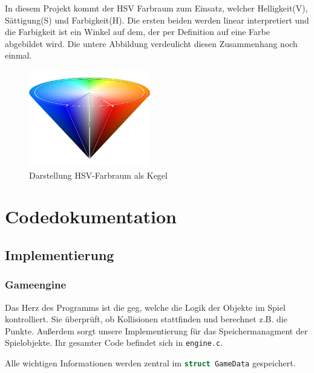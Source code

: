 \documentclass[11pt]{article}
\newcommand{\lstin}[1]{\lstinline[language=C]{#1}}
\begin{document}
In diesem Projekt kommt der HSV Farbraum zum Einsatz, welcher Helligkeit(V), Sättigung(S) und Farbigkeit(H).
Die ersten beiden werden linear interpretiert und die Farbigkeit ist ein Winkel auf dem, der per Definition auf eine Farbe abgebildet wird.
Die untere Abbildung verdeulicht diesen Zusammenhang noch einmal. 
\cite{CS2}
\begin{figure}[h]
  \centering
  \includegraphics[width=200px]{../images/hsv.png}
  \caption{Darstellung HSV-Farbraum als Kegel}
\end{figure}

\section{Codedokumentation}


\subsection{Implementierung} 

\subsubsection{Gameengine}

Das Herz des Programms ist die \gls{geg}, welche die Logik der Objekte im Spiel kontrolliert.
Sie überprüft, ob Kollisionen stattfinden und berechnet z.B. die Punkte. 
Außerdem sorgt unsere Implementierung für das Speichermanagment der Spielobjekte.
Ihr gesamter Code befindet sich in \lstin{engine.c}.

Alle wichtigen Informationen werden zentral im \lstin{struct GameData} gespeichert.
\end{document}
